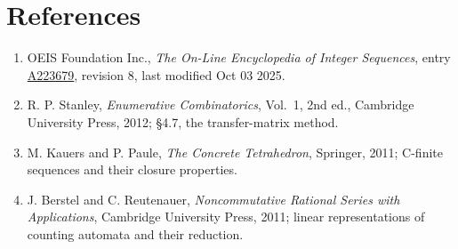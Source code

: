 \documentclass[11pt]{article}
\theoremstyle{definition}
\begin{document}
\section{References}

\begin{enumerate}

\item OEIS Foundation Inc., \emph{The On-Line Encyclopedia of Integer Sequences}, entry \href{https://oeis.org/A223679}{A223679}, revision 8, last modified Oct 03 2025.

\item R. P. Stanley, \emph{Enumerative Combinatorics}, Vol.~1, 2nd ed., Cambridge University Press, 2012; \S4.7, the transfer-matrix method.

\item M. Kauers and P. Paule, \emph{The Concrete Tetrahedron}, Springer, 2011; C-finite sequences and their closure properties.

\item J. Berstel and C. Reutenauer, \emph{Noncommutative Rational Series with Applications}, Cambridge University Press, 2011; linear representations of counting automata and their reduction.

\end{enumerate}
\end{document}
